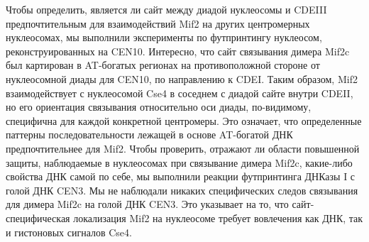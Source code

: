 Чтобы определить, является ли сайт между диадой нуклеосомы и CDEIII  предпочтительным для взаимодействий Mif2 на других центромерных нуклеосомах, мы выполнили эксперименты по футпринтингу нуклеосом, реконструированных на CEN10. Интересно, что сайт связывания димера Mif2c был картирован в AT-богатых регионах на противоположной стороне от нуклеосомной диады для CEN10, по направлению к CDEI. Таким образом, Mif2 взаимодействует с нуклеосомой Cse4 в соседнем с диадой сайте внутри CDEII, но его ориентация связывания относительно оси диады, по-видимому, специфична для каждой конкретной центромеры. Это означает, что определенные паттерны последовательности лежащей в основе AT-богатой ДНК предпочтительнее для Mif2. Чтобы проверить, отражают ли  области повышенной защиты, наблюдаемые в нуклеосомах при связывание димера Mif2c, какие-либо свойства ДНК самой по себе, мы выполнили реакции футпринтинга ДНКазы I с голой ДНК CEN3. Мы не наблюдали никаких специфических следов связывания для димера Mif2c на голой ДНК CEN3. Это указывает на то, что сайт-специфическая локализация Mif2 на нуклеосоме требует вовлечения как ДНК, так и гистоновых сигналов Cse4.

